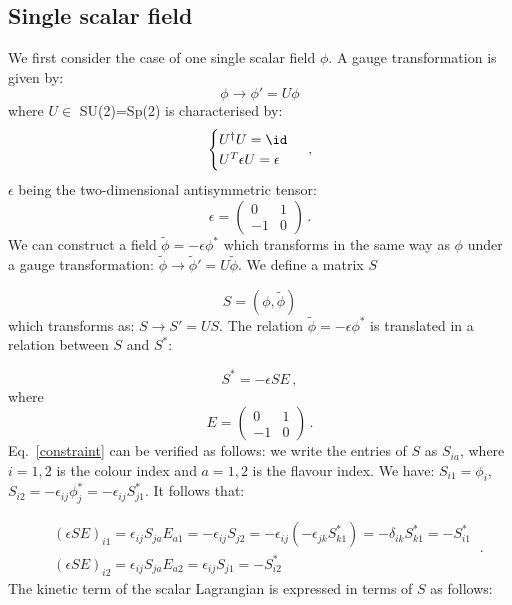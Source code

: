 \subsection{Single scalar field}


We first consider the case of one single scalar field $\phi$. A gauge transformation is given by:
%
\begin{equation}
\phi \to \phi' = U \phi
\end{equation}
%
where $U \in$ SU(2)=Sp(2) is characterised by: 
%
\begin{equation}
\begin{cases}
U^{\dagger}U = \id \\
U^{T}\epsilon U = \epsilon
\end{cases} \: ,
\end{equation}
%
$\epsilon$ being the two-dimensional antisymmetric tensor:
%
\begin{equation}
\epsilon =
\begin{pmatrix}
0 & 1 \\
-1 & 0
\end{pmatrix} \, .
\end{equation}
%
We can construct a field $\tilde{\phi}=-\epsilon \phi^*$ which transforms in the same way as $\phi$ under a gauge transformation:  $\tilde{\phi} \to \tilde{\phi}' = U \tilde{\phi}$.
%
We define a matrix $S$

\begin{equation}
S = (\phi, \tilde{\phi})
\label{S1}
\end{equation}
%
which transforms as: $S \to S'= US$.
The relation $\tilde{\phi}=-\epsilon \phi^*$ is translated in a relation between $S$ and $S^*$:

\begin{equation}
S^* = - \epsilon S E \, ,
\label{constraint}
\end{equation}
%
where
%
\begin{equation}
E =
\begin{pmatrix}
0 & 1 \\
-1 & 0
\end{pmatrix} \, .
\end{equation}
%
Eq.~\ref{constraint} can be verified as follows: we write the entries of $S$ as $S_{ia}$, where $i = 1,2$ is the colour index and $a = 1,2$ is the flavour index. We have: $S_{i1} = \phi_i$, $S_{i2} = - \epsilon_{ij} \phi^*_j = - \epsilon_{ij} S^*_{j1}$. It follows that:

\begin{equation}
\begin{split}
& (\epsilon S E)_{i1} = \epsilon_{ij} S_{ja} E_{a1} = - \epsilon_{ij} S_{j2} = -\epsilon_{ij} (- \epsilon_{jk} S_{k1}^*) = -\delta_{ik}S_{k1}^* = -S_{i1}^* \\
& (\epsilon S E)_{i2} = \epsilon_{ij} S_{ja} E_{a2} = \epsilon_{ij} S_{j1} = - S_{i2}^*
\end{split} \: .
\end{equation}
%
The kinetic term of the scalar Lagrangian is expressed in terms of $S$ as follows:

